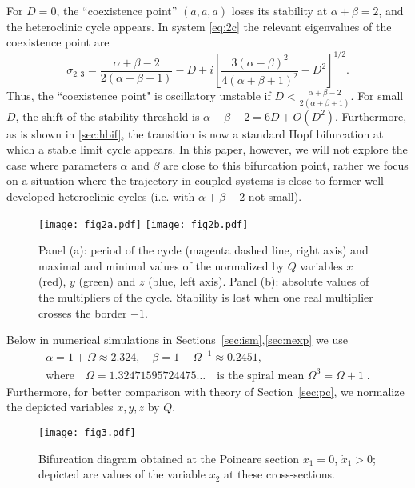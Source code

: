 \documentclass[3p,number,review,sort&compress]{elsarticle}
\begin{document}
For $D=0$, the ``coexistence point'' $(a,a,a)$ loses its stability
at $\alpha+\beta=2$, and the heteroclinic cycle appears. In system
\eqref{eq:2c} the relevant eigenvalues of the coexistence point are
\begin{equation}
\sigma_{2,3}=\frac{\alpha+\beta-2}{2(\alpha+\beta+1)}-D\pm 
i\left[\frac{3(\alpha-\beta)^2}{4(\alpha+\beta+1)^2}
-D^2\right]^{1/2}.
\label{eq:scp}
\end{equation}
Thus, the ``coexistence point" is oscillatory unstable if 
$D<\frac{\alpha+\beta-2}{2(\alpha+\beta+1)}$. For small $D$,
 the shift of the stability threshold is 
$\alpha+\beta-2=6D+O(D^2)$. Furthermore, as is shown in  \ref{sec:hbif}, the transition is now a standard Hopf bifurcation at which
a stable limit cycle appears. In this paper, however,
we will not explore the case where parameters $\alpha$ and $\beta$ are close
to this bifurcation point, rather we focus on a situation where the trajectory
in coupled systems
is close to former
well-developed heteroclinic cycles (i.e. with $\alpha+\beta-2$ not small).


\begin{figure}[!htb]
\centering
\texttt{[image: fig2a.pdf]}\hfill
\texttt{[image: fig2b.pdf]}
\caption{Panel (a): period of the cycle (magenta dashed line,
right axis) and maximal and minimal values of the normalized by $Q$ variables $x$ (red), $y$ (green) and $z$ (blue, left axis). 
Panel (b): absolute values
of the multipliers of the cycle. Stability is lost when one real multiplier crosses the border $-1$.}
\label{fig:manM1}
\end{figure}

Below in numerical simulations in Sections~\ref{sec:ism},\ref{sec:nexp} we use 
\begin{equation}
\begin{gathered}
\alpha=1+\Omega\approx 2.324,\quad \beta=1-\Omega^{-1}\approx 0.2451, \\
\text{where}\quad \Omega=1.32471595724475\ldots\quad \text{is the spiral mean }\Omega^3=\Omega+1\;.
\end{gathered}
\label{eq:spm}
\end{equation} 
Furthermore, for better comparison with theory of 
Section~\ref{sec:pc}, we normalize the depicted variables $x,y,z$ by $Q$.

\begin{figure}[!htb]
\centering
\texttt{[image: fig3.pdf]}
\caption{Bifurcation diagram obtained at the Poincare section $x_1=0$, $\dot x_1>0$; depicted are values of the variable $x_2$ at these cross-sections.}
\label{fig:manbd}
\end{figure}
\end{document}
